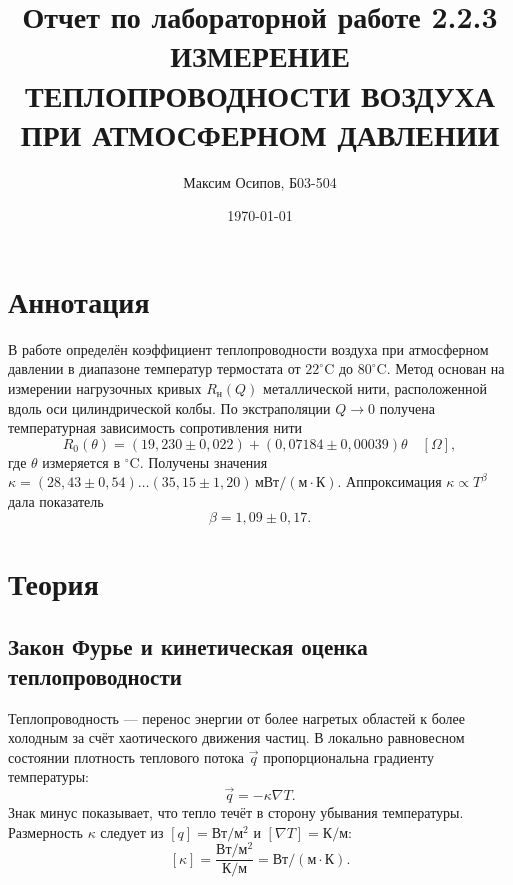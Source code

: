 \documentclass[a4paper,12pt]{article}
\title{Отчет по лабораторной работе 2.2.3 \\ ИЗМЕРЕНИЕ ТЕПЛОПРОВОДНОСТИ
ВОЗДУХА ПРИ АТМОСФЕРНОМ
ДАВЛЕНИИ }
\author{Максим Осипов, Б03-504}
\date{\today}
\begin{document}
\maketitle

\section*{Аннотация}
В работе определён коэффициент теплопроводности воздуха при атмосферном давлении в диапазоне температур термостата от $22^\circ\mathrm{C}$ до $80^\circ\mathrm{C}$. Метод основан на измерении нагрузочных кривых $R_{\text{н}}(Q)$ металлической нити, расположенной вдоль оси цилиндрической колбы. По экстраполяции $Q\to 0$ получена температурная зависимость сопротивления нити
\[
R_0(\theta)=(19{,}230\pm 0{,}022)+(0{,}07184\pm 0{,}00039)\theta\quad [\Omega],
\]
где $\theta$ измеряется в $^\circ\mathrm{C}$. Получены значения $\kappa=(28{,}43\pm0{,}54)\ldots(35{,}15\pm1{,}20)\,\text{мВт}/(\text{м}\cdot\text{К})$. Аппроксимация $\kappa\propto T^{\beta}$ дала показатель
\[
\beta=1{,}09\pm 0{,}17.
\]

\section{Теория}

\subsection{Закон Фурье и кинетическая оценка теплопроводности}
Теплопроводность --- перенос энергии от более нагретых областей к более холодным за счёт хаотического движения частиц. В локально равновесном состоянии плотность теплового потока $\vec q$ пропорциональна градиенту температуры:
\begin{equation}
\vec q=-\kappa\nabla T.
\label{eq:fourier}
\end{equation}
Знак минус показывает, что тепло течёт в сторону убывания температуры. Размерность $\kappa$ следует из $[q]=\text{Вт}/\text{м}^2$ и $[\nabla T]=\text{К}/\text{м}$:
\[
[\kappa]=\frac{\text{Вт}/\text{м}^2}{\text{К}/\text{м}}=\text{Вт}/(\text{м}\cdot\text{К}).
\]
\end{document}
